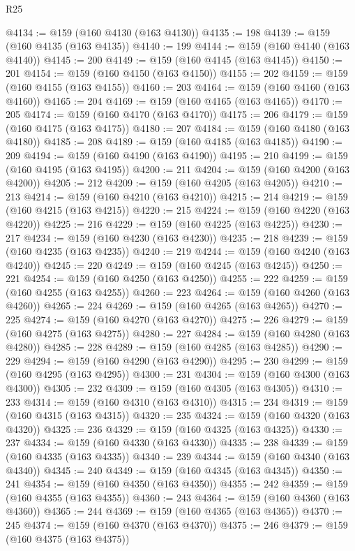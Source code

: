 \begin{lexlean}{R25}
\begin{coremodule}
@4134 := @159 (@160 @4130 (@163 @4130))
@4135 := 198
@4139 := @159 (@160 @4135 (@163 @4135))
@4140 := 199
@4144 := @159 (@160 @4140 (@163 @4140))
@4145 := 200
@4149 := @159 (@160 @4145 (@163 @4145))
@4150 := 201
@4154 := @159 (@160 @4150 (@163 @4150))
@4155 := 202
@4159 := @159 (@160 @4155 (@163 @4155))
@4160 := 203
@4164 := @159 (@160 @4160 (@163 @4160))
@4165 := 204
@4169 := @159 (@160 @4165 (@163 @4165))
@4170 := 205
@4174 := @159 (@160 @4170 (@163 @4170))
@4175 := 206
@4179 := @159 (@160 @4175 (@163 @4175))
@4180 := 207
@4184 := @159 (@160 @4180 (@163 @4180))
@4185 := 208
@4189 := @159 (@160 @4185 (@163 @4185))
@4190 := 209
@4194 := @159 (@160 @4190 (@163 @4190))
@4195 := 210
@4199 := @159 (@160 @4195 (@163 @4195))
@4200 := 211
@4204 := @159 (@160 @4200 (@163 @4200))
@4205 := 212
@4209 := @159 (@160 @4205 (@163 @4205))
@4210 := 213
@4214 := @159 (@160 @4210 (@163 @4210))
@4215 := 214
@4219 := @159 (@160 @4215 (@163 @4215))
@4220 := 215
@4224 := @159 (@160 @4220 (@163 @4220))
@4225 := 216
@4229 := @159 (@160 @4225 (@163 @4225))
@4230 := 217
@4234 := @159 (@160 @4230 (@163 @4230))
@4235 := 218
@4239 := @159 (@160 @4235 (@163 @4235))
@4240 := 219
@4244 := @159 (@160 @4240 (@163 @4240))
@4245 := 220
@4249 := @159 (@160 @4245 (@163 @4245))
@4250 := 221
@4254 := @159 (@160 @4250 (@163 @4250))
@4255 := 222
@4259 := @159 (@160 @4255 (@163 @4255))
@4260 := 223
@4264 := @159 (@160 @4260 (@163 @4260))
@4265 := 224
@4269 := @159 (@160 @4265 (@163 @4265))
@4270 := 225
@4274 := @159 (@160 @4270 (@163 @4270))
@4275 := 226
@4279 := @159 (@160 @4275 (@163 @4275))
@4280 := 227
@4284 := @159 (@160 @4280 (@163 @4280))
@4285 := 228
@4289 := @159 (@160 @4285 (@163 @4285))
@4290 := 229
@4294 := @159 (@160 @4290 (@163 @4290))
@4295 := 230
@4299 := @159 (@160 @4295 (@163 @4295))
@4300 := 231
@4304 := @159 (@160 @4300 (@163 @4300))
@4305 := 232
@4309 := @159 (@160 @4305 (@163 @4305))
@4310 := 233
@4314 := @159 (@160 @4310 (@163 @4310))
@4315 := 234
@4319 := @159 (@160 @4315 (@163 @4315))
@4320 := 235
@4324 := @159 (@160 @4320 (@163 @4320))
@4325 := 236
@4329 := @159 (@160 @4325 (@163 @4325))
@4330 := 237
@4334 := @159 (@160 @4330 (@163 @4330))
@4335 := 238
@4339 := @159 (@160 @4335 (@163 @4335))
@4340 := 239
@4344 := @159 (@160 @4340 (@163 @4340))
@4345 := 240
@4349 := @159 (@160 @4345 (@163 @4345))
@4350 := 241
@4354 := @159 (@160 @4350 (@163 @4350))
@4355 := 242
@4359 := @159 (@160 @4355 (@163 @4355))
@4360 := 243
@4364 := @159 (@160 @4360 (@163 @4360))
@4365 := 244
@4369 := @159 (@160 @4365 (@163 @4365))
@4370 := 245
@4374 := @159 (@160 @4370 (@163 @4370))
@4375 := 246
@4379 := @159 (@160 @4375 (@163 @4375))

\end{coremodule}
\end{lexlean}
